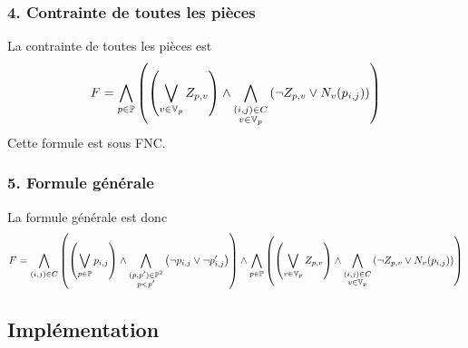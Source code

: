     \subsubsection*{4. Contrainte de toutes les pièces}
    La contrainte de toutes les pièces est
    \[F = \bigwedge_{p\in\mathbb{P}} \left(\left( \bigvee_{v\in\mathbb{V}_p} Z_{p,v} \right) \land
        \bigwedge_{\substack{(i,j)\in C\\v\in\mathbb{V}_p}} \left(\lnot Z_{p,v} \lor N_v(p_{i,j}) \right)\right)\]
    Cette formule est sous FNC.
    
    \subsubsection*{5. Formule générale}
    La formule générale est donc
    \[F = \bigwedge_{(i,j)\in C} \left(\left(\bigvee_{p\in\mathbb{P}} p_{i,j} \right) \land
        \bigwedge_{\substack{(p,p')\in\mathbb{P}^2\\p<p'}}\left(\lnot p_{i,j} \lor \lnot p'_{i,j}\right)\right) \land
        \bigwedge_{p\in\mathbb{P}} \left(\left( \bigvee_{v\in\mathbb{V}_p} Z_{p,v} \right) \land
        \bigwedge_{\substack{(i,j)\in C\\v\in\mathbb{V}_p}} \left(\lnot Z_{p,v} \lor N_v(p_{i,j}) \right)\right)\]
    
    \subsection*{Implémentation}
    

